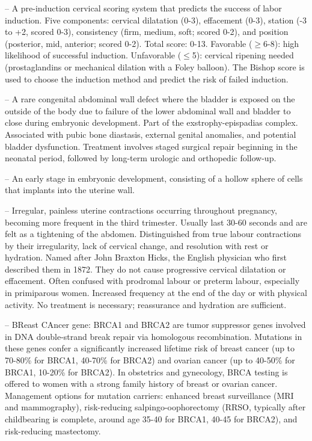 -- A pre-induction cervical scoring system that predicts the success of labor induction. Five components: cervical dilatation (0-3), effacement (0-3), station (-3 to +2, scored 0-3), consistency (firm, medium, soft; scored 0-2), and position (posterior, mid, anterior; scored 0-2). Total score: 0-13. Favorable (\(\ge\)6-8): high likelihood of successful induction. Unfavorable (\(\le\)5): cervical ripening needed (prostaglandins or mechanical dilation with a Foley balloon). The Bishop score is used to choose the induction method and predict the risk of failed induction.

-- A rare congenital abdominal wall defect where the bladder is exposed on the outside of the body due to failure of the lower abdominal wall and bladder to close during embryonic development. Part of the exstrophy-epispadias complex. Associated with pubic bone diastasis, external genital anomalies, and potential bladder dysfunction. Treatment involves staged surgical repair beginning in the neonatal period, followed by long-term urologic and orthopedic follow-up.

-- An early stage in embryonic development, consisting of a hollow sphere of cells that implants into the uterine wall.

-- Irregular, painless uterine contractions occurring throughout pregnancy, becoming more frequent in the third trimester. Usually last 30-60 seconds and are felt as a tightening of the abdomen. Distinguished from true labour contractions by their irregularity, lack of cervical change, and resolution with rest or hydration. Named after John Braxton Hicks, the English physician who first described them in 1872. They do not cause progressive cervical dilatation or effacement. Often confused with prodromal labour or preterm labour, especially in primiparous women. Increased frequency at the end of the day or with physical activity. No treatment is necessary; reassurance and hydration are sufficient.

-- BReast CAncer gene: BRCA1 and BRCA2 are tumor suppressor genes involved in DNA double-strand break repair via homologous recombination. Mutations in these genes confer a significantly increased lifetime risk of breast cancer (up to 70-80\% for BRCA1, 40-70\% for BRCA2) and ovarian cancer (up to 40-50\% for BRCA1, 10-20\% for BRCA2). In obstetrics and gynecology, BRCA testing is offered to women with a strong family history of breast or ovarian cancer. Management options for mutation carriers: enhanced breast surveillance (MRI and mammography), risk-reducing salpingo-oophorectomy (RRSO, typically after childbearing is complete, around age 35-40 for BRCA1, 40-45 for BRCA2), and risk-reducing mastectomy.

